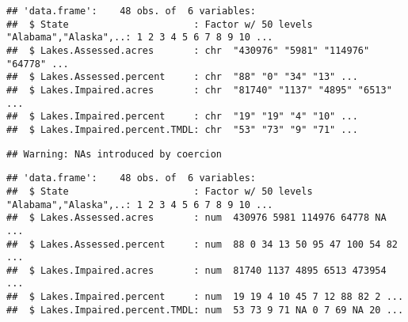 \documentclass[]{article}
\newenvironment{Shaded}{\begin{snugshade}}{\end{snugshade}}
\newcommand{\KeywordTok}[1]{\textcolor[rgb]{0.13,0.29,0.53}{\textbf{#1}}}
\newcommand{\NormalTok}[1]{#1}
\newcommand{\OperatorTok}[1]{\textcolor[rgb]{0.81,0.36,0.00}{\textbf{#1}}}
\newcommand{\StringTok}[1]{\textcolor[rgb]{0.31,0.60,0.02}{#1}}
\begin{document}
\begin{verbatim}
## 'data.frame':    48 obs. of  6 variables:
##  $ State                      : Factor w/ 50 levels "Alabama","Alaska",..: 1 2 3 4 5 6 7 8 9 10 ...
##  $ Lakes.Assessed.acres       : chr  "430976" "5981" "114976" "64778" ...
##  $ Lakes.Assessed.percent     : chr  "88" "0" "34" "13" ...
##  $ Lakes.Impaired.acres       : chr  "81740" "1137" "4895" "6513" ...
##  $ Lakes.Impaired.percent     : chr  "19" "19" "4" "10" ...
##  $ Lakes.Impaired.percent.TMDL: chr  "53" "73" "9" "71" ...
\end{verbatim}

\begin{Shaded}
\end{Shaded}

\begin{verbatim}
## Warning: NAs introduced by coercion
\end{verbatim}

\begin{Shaded}
\end{Shaded}

\begin{verbatim}
## 'data.frame':    48 obs. of  6 variables:
##  $ State                      : Factor w/ 50 levels "Alabama","Alaska",..: 1 2 3 4 5 6 7 8 9 10 ...
##  $ Lakes.Assessed.acres       : num  430976 5981 114976 64778 NA ...
##  $ Lakes.Assessed.percent     : num  88 0 34 13 50 95 47 100 54 82 ...
##  $ Lakes.Impaired.acres       : num  81740 1137 4895 6513 473954 ...
##  $ Lakes.Impaired.percent     : num  19 19 4 10 45 7 12 88 82 2 ...
##  $ Lakes.Impaired.percent.TMDL: num  53 73 9 71 NA 0 7 69 NA 20 ...
\end{verbatim}
\end{document}
